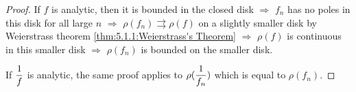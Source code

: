 \begin{proof}
    If  $ f  $ is analytic, then it is bounded in the closed disk $ \Rightarrow $  $ f_n $ has no  poles in this disk for all large  $ n  $ $ \Rightarrow $  $ \rho(f_n)\rightrightarrows \rho(f) $ on a slightly smaller disk by Weierstrass theorem \ref{thm:5.1.1:Weierstrass's Theorem} $ \Rightarrow  $  $ \rho(f)  $ is continuous in this smaller disk $ \Rightarrow  $  $ \rho(f_n ) $ is bounded on the smaller disk.
    
    If  $ \displaystyle\frac{1}{f} $ is analytic, the same proof applies to  $ \rho(\displaystyle\frac{1}{f_n}) $ which is equal to  $ \rho(f_n) $.   
\end{proof}